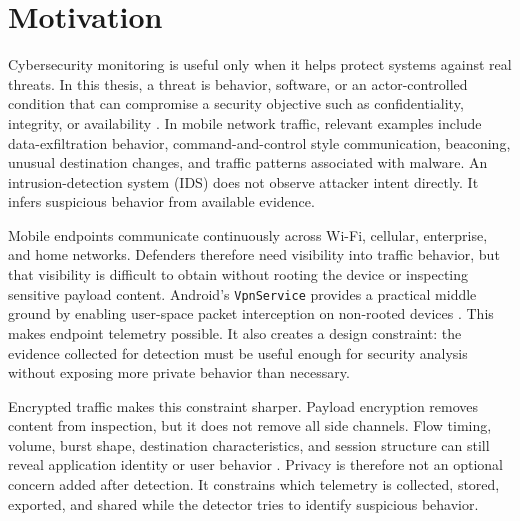 \section{Motivation}
Cybersecurity monitoring is useful only when it helps protect systems against real threats. In this
thesis, a threat is behavior, software, or an actor-controlled condition that can compromise a
security objective such as confidentiality, integrity, or availability \citep{nist_fips_199}. In
mobile network traffic, relevant examples include data-exfiltration behavior, command-and-control
style communication, beaconing, unusual destination changes, and traffic patterns associated with
malware. An intrusion-detection system (IDS) does not observe attacker intent directly. It infers
suspicious behavior from available evidence.

Mobile endpoints communicate continuously across Wi-Fi, cellular, enterprise, and home networks.
Defenders therefore need visibility into traffic behavior, but that visibility is difficult to obtain
without rooting the device or inspecting sensitive payload content. Android's \texttt{VpnService}
provides a practical middle ground by enabling user-space packet interception on non-rooted devices
\citep{android_vpnservice}. This makes endpoint telemetry possible. It also creates a design
constraint: the evidence collected for detection must be useful enough for security analysis without
exposing more private behavior than necessary.

Encrypted traffic makes this constraint sharper. Payload encryption removes content from inspection,
but it does not remove all side channels. Flow timing, volume, burst shape, destination
characteristics, and session structure can still reveal application identity or user behavior
\citep{deep_fingerprinting_2018,gat_mobile_app_2023}. Privacy is therefore not an optional concern
added after detection. It constrains which telemetry is collected, stored, exported, and shared while
the detector tries to identify suspicious behavior.

